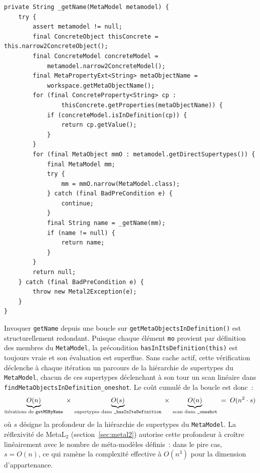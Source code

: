 \begin{lstlisting}[firstnumber=370,
  caption={\texttt{\_getName} --- méthode interne de
  \texttt{MetaObject\_impl}. Pas de vérification d'appartenance~:
  l'invariant est supposé garanti par l'appelant.},
  label={ls--getname}]
private String _getName(MetaModel metamodel) {
    try {
        assert metamodel != null;
        final ConcreteObject thisConcrete = this.narrow2ConcreteObject();
        final ConcreteModel concreteModel =
            metamodel.narrow2ConcreteModel();
        final MetaPropertyExt<String> metaObjectName =
            workspace.getMetaObjectName();
        for (final ConcreteProperty<String> cp :
                thisConcrete.getProperties(metaObjectName)) {
            if (concreteModel.isInDefinition(cp)) {
                return cp.getValue();
            }
        }
        for (final MetaObject mmO : metamodel.getDirectSupertypes()) {
            final MetaModel mm;
            try {
                mm = mmO.narrow(MetaModel.class);
            } catch (final BadPreCondition e) {
                continue;
            }
            final String name = _getName(mm);
            if (name != null) {
                return name;
            }
        }
        return null;
    } catch (final BadPreCondition e) {
        throw new Metal2Exception(e);
    }
}
\end{lstlisting}

Invoquer \texttt{getName} depuis une boucle sur
\texttt{getMetaObjectsInDefinition()} est structurellement redondant.
Puisque chaque élément \texttt{mo} provient par définition des membres
du \texttt{MetaModel}, la précondition \texttt{hasInItsDefinition(this)}
est toujours vraie et son évaluation est superflue. Sans cache actif, cette
vérification déclenche à chaque itération un parcours de la hiérarchie de
supertypes du \texttt{MetaModel}, chacun de ces supertypes déclenchant à
son tour un scan linéaire dans \texttt{findMetaObjectsInDefinition\_oneshot}.
Le coût cumulé de la boucle est donc~:
\[
\underbrace{O(n)}_{\text{itérations de \texttt{getMOByName}}}
\;\times\;
\underbrace{O(s)}_{\text{supertypes dans \texttt{\_hasInItsDefinition}}}
\;\times\;
\underbrace{O(n)}_{\text{scan dans \texttt{\_oneshot}}}
\;=\; O(n^2 \cdot s)
\]
où $s$ désigne la profondeur de la hiérarchie de supertypes du
\texttt{MetaModel}. La réflexivité de MetaL$_2$ (section~\ref{sec:metal2})
autorise cette profondeur à croître linéairement avec le nombre de
méta-modèles définis~: dans le pire cas, $s = O(n)$, ce qui ramène la
complexité effective à $O(n^3)$ pour la dimension d'appartenance.

